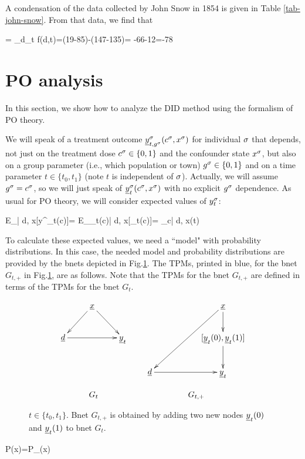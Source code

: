 A condensation of the
data collected by John Snow in 1854
is given in Table \ref{tab-john-snow}.
From that data, we find that

\beq
\delta= \Delta_d\Delta_t f(d,t)=(19-85)-(147-135)=
-66-12=-78
\eeq



\section{PO analysis}
In this section,
we show how
to analyze the
DID method
using the formalism of PO theory.

We will speak of a treatment 
outcome
${\underline{y}}^\sigma_{t, g^\sigma}
(c^\sigma, x^\sigma)$
for individual $\sigma$
that depends, not 
just on the treatment dose 
$c^\sigma\in \{0,1\}$
and the confounder state $x^\sigma$,
but also
on a group parameter (i.e., which population
or town)
$g^\sigma\in \{0,1\}$
and on a time parameter $t\in\{t_0, t_1\}$ 
(note $t$ is independent of $\sigma$).
Actually,
we will assume $g^\sigma=c^\sigma$,
so we will just speak of
${\underline{y}}^\sigma_t(c^\sigma, x^\sigma)$
with no explicit $g^\sigma$
dependence. As usual for PO theory,
we will consider
expected values of $y^\sigma_t$:


\beq
E_{\s| d, x}[y^\s_t(c)]=
 E_{\rvy_t(c)| d, x}[\rvy_t(c)]=
\caly_{c| d, x}(t)
\eeq

To calculate these
expected values, we need a ``model"
with probability 
distributions.
In this case,
the needed model and probability
distributions are
provided by the
bnets depicted in Fig.\ref{fig-did-G_t-+}.
The TPMs,
printed in blue,
for the 
 bnet
$G_{t, +}$
in Fig.\ref{fig-did-G_t-+},
are as follows.
Note
that the
TPMs for the bnet $G_{t, +}$
are defined in 
terms
of the TPMs for the bnet $G_t$.


\begin{figure}[h!]
$$
\begin{array}{ccccc}
\xymatrix{
&\rvx\ar[dl]\ar[dr]
\\
\rvd\ar[rr]&&\rvy_t
}
&&
\xymatrix{
&&\rvx\ar[d]\ar[ddll]
\\
&&[\rvy_t(0), \rvy_t(1)]
\ar[d]
\\
\rvd\ar[rr]
&&\rvy_t
}
\\
\\
G_t&&G_{t, +}
\end{array}
$$
\caption{$t\in \{t_0, t_1\}$.
Bnet 
$G_{t,+}$
is obtained 
by adding
two new nodes
${\underline{y}}_t(0)$
and ${\underline{y}}_t(1)$ to bnet $G_t$.}
\label{fig-did-G_t-+}
\end{figure}

\beq\color{blue}
P(x)=P_{\rvx}(x)
\eeq

